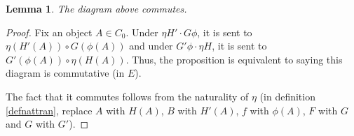 \documentclass{article}
\newtheorem{lem}[thm]{Lemma}
\theoremstyle{definition}
\theoremstyle{remark}
\begin{document}
\begin{lem}
	The diagram above commutes.
\end{lem}
\begin{proof}
Fix an object $A \in C_0$. Under $\eta H' \cdot G\phi$, it is sent to $\eta(H'(A)) \circ G(\phi(A))$ and under $G'\phi \cdot \eta H$, it is sent to $G'(\phi(A)) \circ \eta(H(A))$. Thus, the proposition is equivalent to saying this diagram is commutative (in $E$).
\begin{figure}[h]
	\centering
\end{figure}

The fact that it commutes follows from the naturality of $\eta$ (in definition \ref{defnattran}, replace $A$ with $H(A)$, $B$ with $H'(A)$, $f$ with $\phi(A)$, $F$ with $G$ and $G$ with $G'$).
\end{proof}
\end{document}
